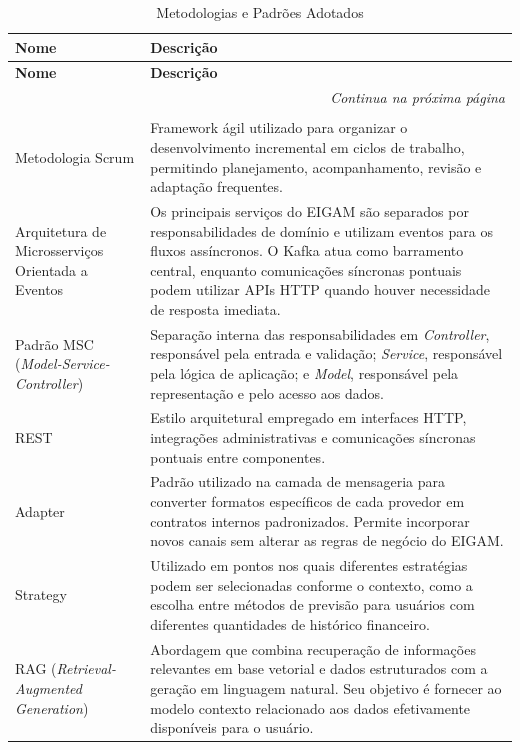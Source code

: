 {\small
\begin{longtable}{|p{4.5cm}|p{10cm}|}
\caption{Metodologias e Padrões Adotados} \label{qua:padroes} \\
\hline
\textbf{Nome} & \textbf{Descrição} \\ \hline
\endfirsthead
\hline
\textbf{Nome} & \textbf{Descrição} \\ \hline
\endhead
\hline
\multicolumn{2}{r}{\fontsize{10pt}{10pt}\selectfont\textit{Continua na próxima página}} \\
\endfoot
\hline
\multicolumn{2}{c}{\fontsize{10pt}{10pt}\selectfont \textbf{Fonte:} Elaborado pelos autores (2026).} \\
\endlastfoot

Metodologia Scrum & Framework ágil utilizado para organizar o desenvolvimento incremental em ciclos de trabalho, permitindo planejamento, acompanhamento, revisão e adaptação frequentes. \\ \hline
Arquitetura de Microsserviços Orientada a Eventos & Os principais serviços do EIGAM são separados por responsabilidades de domínio e utilizam eventos para os fluxos assíncronos. O Kafka atua como barramento central, enquanto comunicações síncronas pontuais podem utilizar APIs HTTP quando houver necessidade de resposta imediata. \\ \hline
Padrão MSC (\textit{Model-Service-Controller}) & Separação interna das responsabilidades em \textit{Controller}, responsável pela entrada e validação; \textit{Service}, responsável pela lógica de aplicação; e \textit{Model}, responsável pela representação e pelo acesso aos dados. \\ \hline
REST & Estilo arquitetural empregado em interfaces HTTP, integrações administrativas e comunicações síncronas pontuais entre componentes. \\ \hline
Adapter & Padrão utilizado na camada de mensageria para converter formatos específicos de cada provedor em contratos internos padronizados. Permite incorporar novos canais sem alterar as regras de negócio do EIGAM. \\ \hline
Strategy & Utilizado em pontos nos quais diferentes estratégias podem ser selecionadas conforme o contexto, como a escolha entre métodos de previsão para usuários com diferentes quantidades de histórico financeiro. \\ \hline
RAG (\textit{Retrieval-Augmented Generation}) & Abordagem que combina recuperação de informações relevantes em base vetorial e dados estruturados com a geração em linguagem natural. Seu objetivo é fornecer ao modelo contexto relacionado aos dados efetivamente disponíveis para o usuário. \\ \hline

\end{longtable}}
